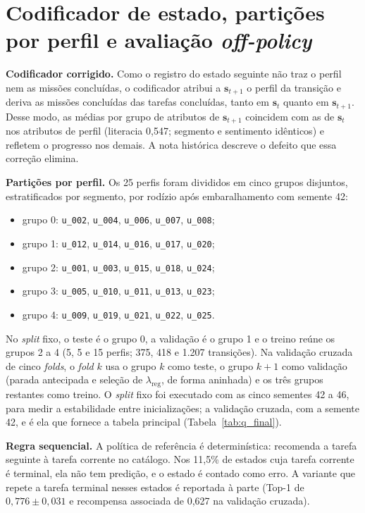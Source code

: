 \section*{Codificador de estado, partições por perfil e avaliação \textit{off-policy}}
\label{sec:apendice_particoes}

\noindent\textbf{Codificador corrigido.} Como o registro do estado seguinte não traz o perfil nem as missões concluídas, o codificador atribui a $\mathbf{s}_{t+1}$ o perfil da transição e deriva as missões concluídas das tarefas concluídas, tanto em $\mathbf{s}_t$ quanto em $\mathbf{s}_{t+1}$. Desse modo, as médias por grupo de atributos de $\mathbf{s}_{t+1}$ coincidem com as de $\mathbf{s}_t$ nos atributos de perfil (literacia 0,547; segmento e sentimento idênticos) e refletem o progresso nos demais. A nota histórica descreve o defeito que essa correção elimina.

\noindent\textbf{Partições por perfil.} Os 25 perfis foram divididos em cinco grupos disjuntos, estratificados por segmento, por rodízio após embaralhamento com semente 42:
\begin{itemize}
    \item grupo 0: \texttt{u\_002}, \texttt{u\_004}, \texttt{u\_006}, \texttt{u\_007}, \texttt{u\_008};
    \item grupo 1: \texttt{u\_012}, \texttt{u\_014}, \texttt{u\_016}, \texttt{u\_017}, \texttt{u\_020};
    \item grupo 2: \texttt{u\_001}, \texttt{u\_003}, \texttt{u\_015}, \texttt{u\_018}, \texttt{u\_024};
    \item grupo 3: \texttt{u\_005}, \texttt{u\_010}, \texttt{u\_011}, \texttt{u\_013}, \texttt{u\_023};
    \item grupo 4: \texttt{u\_009}, \texttt{u\_019}, \texttt{u\_021}, \texttt{u\_022}, \texttt{u\_025}.
\end{itemize}
No \emph{split} fixo, o teste é o grupo 0, a validação é o grupo 1 e o treino reúne os grupos 2 a 4 (5, 5 e 15 perfis; 375, 418 e 1.207 transições). Na validação cruzada de cinco \emph{folds}, o \emph{fold} $k$ usa o grupo $k$ como teste, o grupo $k+1$ como validação (parada antecipada e seleção de $\lambda_{\text{reg}}$, de forma aninhada) e os três grupos restantes como treino. O \emph{split} fixo foi executado com as cinco sementes 42 a 46, para medir a estabilidade entre inicializações; a validação cruzada, com a semente 42, e é ela que fornece a tabela principal (Tabela~\ref{tab:q_final}).

\noindent\textbf{Regra sequencial.} A política de referência é determinística: recomenda a tarefa seguinte à tarefa corrente no catálogo. Nos 11,5\% de estados cuja tarefa corrente é terminal, ela não tem predição, e o estado é contado como erro. A variante que repete a tarefa terminal nesses estados é reportada à parte (Top-1 de $0{,}776 \pm 0{,}031$ e recompensa associada de 0,627 na validação cruzada).

